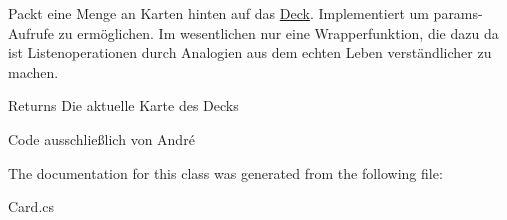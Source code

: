 Packt eine Menge an Karten hinten auf das \mbox{\hyperlink{class_poke_quet_1_1_deck}{Deck}}. Implementiert um params-\/\+Aufrufe zu ermöglichen. Im wesentlichen nur eine Wrapperfunktion, die dazu da ist Listenoperationen durch Analogien aus dem echten Leben verständlicher zu machen. 

\begin{DoxyReturn}{Returns}
Die aktuelle Karte des Decks
\end{DoxyReturn}


Code ausschließlich von André

The documentation for this class was generated from the following file\+:\begin{DoxyCompactItemize}
\item 
Card.\+cs\end{DoxyCompactItemize}
